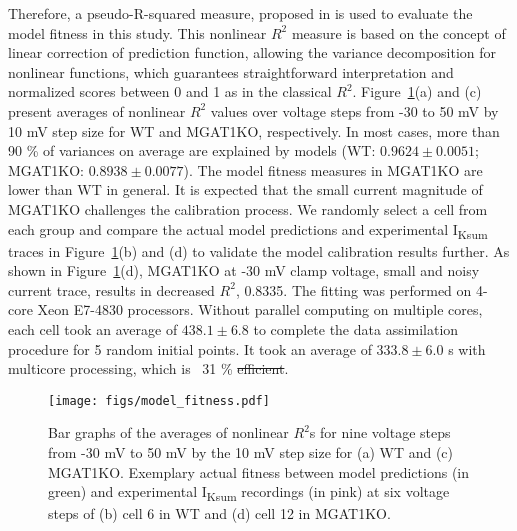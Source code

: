 \documentclass[11pt]{article}
\providecommand{\DIFadd}[1]{{\protect\color{blue}\uwave{#1}}} %
\providecommand{\DIFdel}[1]{{\protect\color{red}\sout{#1}}}                      %
\providecommand{\DIFaddbegin}{} %
\providecommand{\DIFaddend}{} %
\providecommand{\DIFdelbegin}{} %
\providecommand{\DIFdelend}{} %
\newcommand{\DIFscaledelfig}{0.5}
\newlength{\DIFdelgraphicswidth} %
\newlength{\DIFdelgraphicsheight} %
\newcommand{\DIFaddincludegraphics}[2][]{{\color{blue}\fbox{\DIFOincludegraphics[#1]{#2}}}} %
\newcommand{\DIFdelincludegraphics}[2][]{%
\sbox{\DIFdelgraphicsbox}{\DIFOincludegraphics[#1]{#2}}%
\settoboxwidth{\DIFdelgraphicswidth}{\DIFdelgraphicsbox} %
\settoboxtotalheight{\DIFdelgraphicsheight}{\DIFdelgraphicsbox} %
\scalebox{\DIFscaledelfig}{%
\parbox[b]{\DIFdelgraphicswidth}{\usebox{\DIFdelgraphicsbox}\\[-\baselineskip] \rule{\DIFdelgraphicswidth}{0em}}\llap{\resizebox{\DIFdelgraphicswidth}{\DIFdelgraphicsheight}{%
\setlength{\unitlength}{\DIFdelgraphicswidth}%
\begin{picture}(1,1)%
\thicklines\linethickness{2pt} %
{\color[rgb]{1,0,0}\put(0,0){\framebox(1,1){}}}%
{\color[rgb]{1,0,0}\put(0,0){\line( 1,1){1}}}%
{\color[rgb]{1,0,0}\put(0,1){\line(1,-1){1}}}%
\end{picture}%
}\hspace*{3pt}}} %
} %
\DeclareRobustCommand{\DIFaddbegin}{\DIFOaddbegin \let\includegraphics\DIFaddincludegraphics} %
\DeclareRobustCommand{\DIFaddend}{\DIFOaddend \let\includegraphics\DIFOincludegraphics} %
\DeclareRobustCommand{\DIFdelbegin}{\DIFOdelbegin \let\includegraphics\DIFdelincludegraphics} %
\DeclareRobustCommand{\DIFdelend}{\DIFOaddend \let\includegraphics\DIFOincludegraphics} %
\begin{document}
Therefore, a pseudo-R-squared measure, proposed in \citep{li2019prediction} is used to evaluate the model fitness in this study. This nonlinear $R^{2}$ measure is based on the concept of linear correction of prediction function, allowing the variance decomposition for nonlinear functions, which guarantees straightforward interpretation and normalized scores between 0 and 1 as in the classical $R^{2}$. Figure~\ref{fig:model_fitness}(a) and (c) present averages of nonlinear $R^{2}$ values over voltage steps from -30 to 50 mV by 10 mV step size for WT and MGAT1KO, respectively. In most cases, more than 90 \% of variances on average are explained by models (WT: $0.9624 \pm 0.0051$; MGAT1KO: $0.8938 \pm 0.0077$). The model fitness measures in MGAT1KO are lower than WT in general. It is expected that the small current magnitude of MGAT1KO challenges the calibration process. We randomly select a cell from each group and compare the actual model predictions and experimental I\textsubscript{Ksum} traces in Figure~\ref{fig:model_fitness}(b) and (d) to validate the model calibration results further. As shown in Figure~\ref{fig:model_fitness}(d), MGAT1KO at -30 mV clamp voltage, small and noisy current trace, results in decreased $R^{2}$, 0.8335. The fitting was performed on \DIFaddbegin \DIFadd{Intel }\DIFaddend 4-core Xeon E7-4830 processors. Without parallel computing on multiple cores, each cell took an average of $438.1 \pm 6.8$ \DIFaddbegin \DIFadd{s }\DIFaddend to complete the data assimilation procedure for 5 random initial points. It took an average of $333.8 \pm 6.0$ s with multicore processing, which is ~31 \% \DIFdelbegin \DIFdel{efficient}\DIFdelend \DIFaddbegin \DIFadd{efficiexnt}\DIFaddend .
\begin{figure}[!ht]
    \centering
    \texttt{[image: figs/model\_fitness.pdf]}
    \caption{Bar graphs of the averages of nonlinear $R^{2}$s for nine voltage steps from -30 mV to 50 mV by the 10 mV step size for (a) WT and (c) MGAT1KO. Exemplary actual fitness between model predictions (in green) and experimental I\textsubscript{Ksum} recordings (in pink) at six voltage steps of (b) cell 6 in WT and (d) cell 12 in MGAT1KO.}
    \label{fig:model_fitness}
\end{figure}
\end{document}
